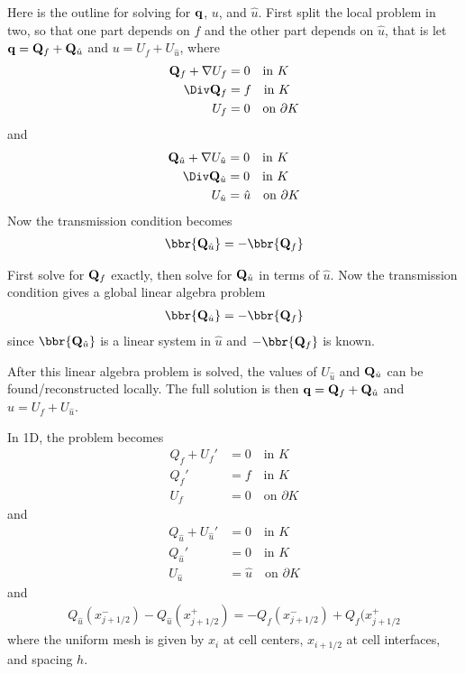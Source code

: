 \documentclass[oneside]{article}
\begin{document}
  Here is the outline for solving for $\mathbf{q}$, $u$, and $\hat{u}$.
  First split the local problem in two, so that one part depends on $f$ and the
  other part depends on $\hat{u}$, that is let
  $\mathbf{q} = \mathbf{Q}_f + \mathbf{Q}_{\hat{u}}$ and $u = U_f + U_{\hat{u}}$, where
  \begin{align*}
    \v{Q}_f + \nabla U_f &= 0 \quad \text{in } K \\
    \Div \v{Q}_f &= f \quad \text{in } K \\
    U_f &= 0 \quad \text{on } \partial K
  \end{align*}
  and
  \begin{align*}
    \v{Q}_{\hat{u}}+ \nabla U_{\hat{u}} &= 0 \quad \text{in } K \\
    \Div \v{Q}_{\hat{u}} &= 0 \quad \text{in } K \\
    U_{\hat{u}} &= \hat{u} \quad \text{on } \partial K
  \end{align*}
  Now the transmission condition becomes
  \begin{align*}
    \bbr{\v{Q}_{\hat{u}}} = -\bbr{\v{Q}_f}
  \end{align*}

  First solve for $\mathbf{Q}_f$ exactly, then solve for $\mathbf{Q}_{\hat{u}}$ in terms
  of $\hat{u}$.
  Now the transmission condition gives a global linear algebra problem
  \begin{align*}
    \bbr{\v{Q}_{\hat{u}}} = -\bbr{\v{Q}_f}
  \end{align*}
  since $\bbr{\v{Q}_{\hat{u}}}$ is a linear system in $\hat{u}$ and
  $-\bbr{\v{Q}_f}$ is known.

  After this linear algebra problem is solved, the values of $U_{\hat{u}}$ and
  $\mathbf{Q}_{\hat{u}}$ can be found/reconstructed locally.
  The full solution is then $\mathbf{q} = \mathbf{Q}_f + \mathbf{Q}_{\hat{u}}$ and
  $u = U_f + U_{\hat{u}}$.

  In 1D, the problem becomes
  \begin{align*}
    Q_f + U_f' &= 0 \quad \text{in } K \\
    Q_f' &= f \quad \text{in } K \\
    U_f &= 0 \quad \text{on } \partial K
  \end{align*}
  and
  \begin{align*}
    Q_{\hat{u}} + U_{\hat{u}}' &= 0 \quad \text{in } K \\
    Q_{\hat{u}}' &= 0 \quad \text{in } K \\
    U_{\hat{u}} &= \hat{u} \quad \text{on } \partial K
  \end{align*}
  and
  \begin{align*}
    Q_{\hat{u}}(x^-_{j+1/2}) - Q_{\hat{u}}(x^+_{j+1/2})  = -Q_f(x^-_{j+1/2}) + Q_f(x^+_{j+1/2}
  \end{align*}
  where the uniform mesh is given by $x_i$ at cell centers, $x_{i+1/2}$ at
  cell interfaces, and spacing $h$.
\end{document}
